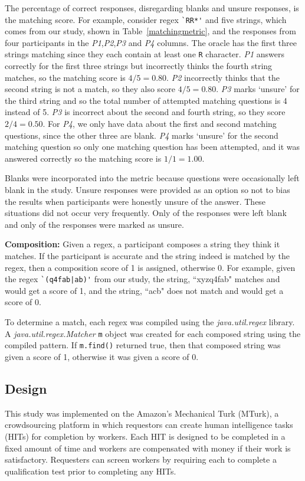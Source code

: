  The percentage of correct responses, disregarding blanks and unsure responses, is the matching score. 
 For example, consider regex \verb!`RR*'! and five strings, which comes from our study, shown in Table~\ref{matchingmetric}, and the responses from four participants in the \emph{P1},\emph{P2},\emph{P3} and \emph{P4} columns. 
 The oracle has the first three strings matching since they each contain at least one \verb!R! character. \emph{P1} answers correctly for the first three strings but incorrectly thinks the fourth string matches, so the matching score is $4/5 = 0.80$. \emph{P2} incorrectly thinks that the second string is not a match, so they also score $4/5 = 0.80$.  \emph{P3} marks `unsure' for the third string and so the total number of attempted matching questions is 4 instead of 5. \emph{P3} is incorrect about the second and fourth string, so they score $2/4 = 0.50$.  For \emph{P4}, we only have data about the first and second matching questions, since the other three are blank.  \emph{P4} marks `unsure' for the second matching question so only one matching question has been attempted, and it was answered correctly so the matching score is $1/1 = 1.00$.
 
Blanks were incorporated into the metric because questions were occasionally left blank in the study. Unsure responses were provided as an option so not to bias the  results when participants were honestly unsure of the answer. These situations did not occur very frequently. Only  of the responses were left blank and only  of the responses were marked as unsure.   


\textbf{Composition:}
Given a regex, a participant composes a string they think it matches. If the participant is accurate and the string indeed is matched by the regex, then a composition score of 1 is assigned, otherwise 0.  For example, given the regex \verb!`(q4fab|ab)'! from our study, the string, ``xyzq4fab" matches  and would get a score of 1, and the string, ``acb" does not match and would get a score of 0.

To determine a match, each regex was compiled using the \emph{java.util.regex} library. A \emph{java.util.regex.Matcher} \verb!m! object was created for each composed string using the compiled pattern.  If \verb!m.find()! returned true, then that composed string was given a score of 1, otherwise it was given a score of 0.



\subsection{Design}
This study was implemented on the Amazon's Mechanical Turk (MTurk),  a crowdsourcing platform in which requestors can create human intelligence tasks (HITs) for completion by workers. Each HIT is designed to be completed in a fixed amount of time and workers are compensated with money if their work is satisfactory. Requesters can screen workers by requiring each to complete a qualification test prior to completing any HITs. 

